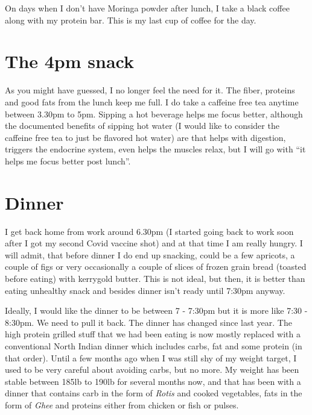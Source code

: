 \documentclass[
  oneside]{book}
\begin{document}
On days when I don't have Moringa powder after lunch, I take a black coffee along with my protein bar. This is my last cup of coffee for the day.

\hypertarget{the-4pm-snack}{%
\section{The 4pm snack}\label{the-4pm-snack}}

As you might have guessed, I no longer feel the need for it. The fiber, proteins and good fats from the lunch keep me full. I do take a caffeine free tea anytime between 3.30pm to 5pm. Sipping a hot beverage helps me focus better, although the documented benefits of sipping hot water (I would like to consider the caffeine free tea to just be flavored hot water) are that helps with digestion, triggers the endocrine system, even helps the muscles relax, but I will go with ``it helps me focus better post lunch''.

\hypertarget{dinner}{%
\section{Dinner}\label{dinner}}

I get back home from work around 6.30pm (I started going back to work soon after I got my second Covid vaccine shot) and at that time I am really hungry. I will admit, that before dinner I do end up snacking, could be a few apricots, a couple of figs or very occasionally a couple of slices of frozen grain bread (toasted before eating) with kerrygold butter. This is not ideal, but then, it is better than eating unhealthy snack and besides dinner isn't ready until 7:30pm anyway.

Ideally, I would like the dinner to be between 7 - 7:30pm but it is more like 7:30 - 8:30pm. We need to pull it back. The dinner has changed since last year. The high protein grilled stuff that we had been eating is now mostly replaced with a conventional North Indian dinner which includes carbs, fat and some protein (in that order). Until a few months ago when I was still shy of my weight target, I used to be very careful about avoiding carbs, but no more. My weight has been stable between 185lb to 190lb for several months now, and that has been with a dinner that contains carb in the form of \emph{Rotis} and cooked vegetables, fats in the form of \emph{Ghee} and proteins either from chicken or fish or pulses.
\end{document}
